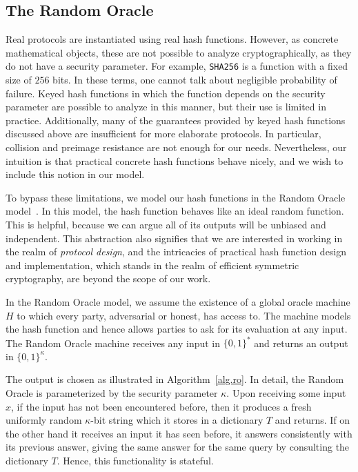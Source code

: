 \subsection{The Random Oracle}

Real protocols are instantiated using real hash functions. However, as concrete
mathematical objects, these are not possible to analyze cryptographically, as
they do not have a security parameter. For example, \texttt{SHA256} is a
function with a fixed size of $256$ bits. In these terms, one cannot talk about
negligible probability of failure. Keyed hash functions in which the function
depends on the security parameter are possible to analyze in this manner, but
their use is limited in practice. Additionally, many of the guarantees provided
by keyed hash functions discussed above are insufficient for more elaborate
protocols. In particular, collision and preimage resistance are not enough for
our needs. Nevertheless, our intuition is that practical concrete hash functions
behave nicely, and we wish to include this notion in our model.

To bypass these limitations, we model our hash functions in the Random Oracle
model~\cite{ro}. In this model, the hash function behaves like an ideal random
function. This is helpful, because we can argue all of its outputs will be
unbiased and independent. This abstraction also signifies that we are interested
in working in the realm of \emph{protocol design}, and the intricacies of
practical hash function design and implementation, which stands in the realm of
efficient symmetric cryptography, are beyond the scope of our work.

In the Random Oracle model, we assume the existence of a global oracle machine
$H$ to which every party, adversarial or honest, has access to. The machine
models the hash function and hence allows parties to ask for its evaluation at
any input. The Random Oracle machine receives any input in $\{0, 1\}^*$ and
returns an output in $\{0, 1\}^\kappa$.



The output is chosen as illustrated in Algorithm~\ref{alg.ro}. In detail, the
Random Oracle is parameterized by the security parameter $\kappa$. Upon
receiving some input $x$, if the input has not been encountered before, then it
produces a fresh uniformly random $\kappa$-bit string which it stores in a
dictionary $T$ and returns. If on the other hand it receives an input it has
seen before, it answers consistently with its previous answer, giving the same
answer for the same query by consulting the dictionary $T$. Hence, this
functionality is stateful.

